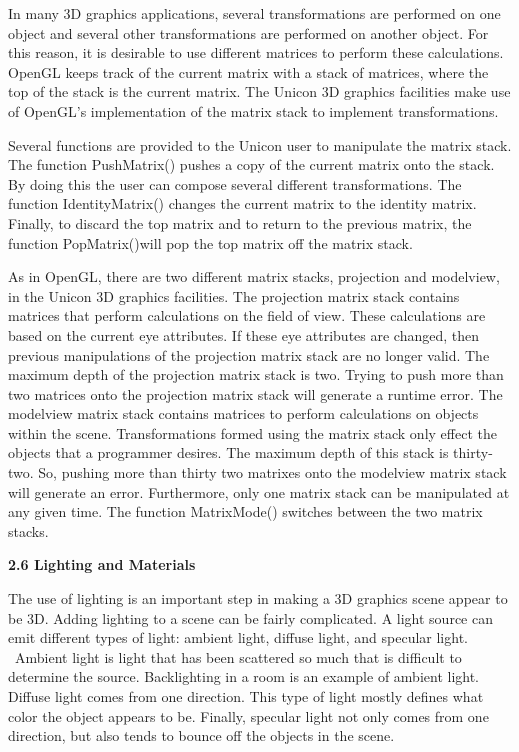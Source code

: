 \documentclass[letterpaper]{article}
\begin{document}
{
In many 3D graphics applications, several transformations are performed on one object and several other transformations
are performed on another object. For this reason, it is desirable to use different matrices to perform these
calculations. OpenGL keeps track of the current matrix with a stack of matrices, where the top of the stack is the
current matrix. The Unicon 3D graphics facilities make use of OpenGL's implementation of the matrix stack to implement
transformations. }

{
Several functions are provided to the Unicon user to manipulate the matrix stack. The function \textsf{PushMatrix()}
pushes a copy of the current matrix onto the stack. By doing this the user can compose several different
transformations. The function \textsf{IdentityMatrix()} changes the current matrix to the identity matrix. Finally, to
discard the top matrix and to return to the previous matrix, the function \textsf{PopMatrix()}will pop the top matrix
off the matrix stack. }

{
As in OpenGL, there are two different matrix stacks, projection and modelview, in the Unicon 3D graphics facilities. The
projection matrix stack contains matrices that perform calculations on the field of view. These calculations are based
on the current eye attributes. If these eye attributes are changed, then previous manipulations of the projection
matrix stack are no longer valid. The maximum depth of the projection matrix stack is two. Trying to push more than two
matrices onto the projection matrix stack will generate a runtime error. The modelview matrix stack contains matrices
to perform calculations on objects within the scene. Transformations formed using the matrix stack only effect the
objects that a programmer desires. The maximum depth of this stack is thirty-two. So, pushing more than thirty two
matrixes onto the modelview matrix stack will generate an error. Furthermore, only one matrix stack can be manipulated
at any given time. The function \textsf{MatrixMode() }switches between the two matrix stacks. }


\bigskip

{\bfseries
2.6 Lighting and Materials}


\bigskip

{
The use of lighting is an important step in making a 3D graphics scene appear to be 3D. Adding lighting to a scene can
be fairly complicated. A light source can emit different types of light: ambient light, diffuse light, and specular
light. \ Ambient light is light that has been scattered so much that is difficult to determine the source. Backlighting
in a room is an example of ambient light. Diffuse light comes from one direction. This type of light mostly defines
what color the object appears to be. Finally, specular light not only comes from one direction, but also tends to
bounce off the objects in the scene. }
\end{document}

